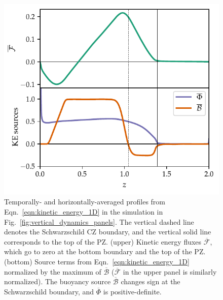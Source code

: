 \documentclass[twocolumn]{aastex631}
\renewcommand{\bar}[1]{\overline{#1}}
\begin{document}
\begin{figure}[t!]
\centering
\includegraphics[width=\columnwidth]{theory_profiles.pdf}
\caption{
Temporally- and horizontally-averaged profiles from Eqn.~\ref{eqn:kinetic_energy_1D} in the simulation in Fig.~\ref{fig:vertical_dynamics_panels}.
The vertical dashed line denotes the Schwarzschild CZ boundary, and the vertical solid line corresponds to the top of the PZ.
(upper) Kinetic energy fluxes $\bar{\mathcal{F}}$, which go to zero at the bottom boundary and the top of the PZ.
(bottom) Source terms from Eqn.~\ref{eqn:kinetic_energy_1D} normalized by the maximum of $\overline{\mathcal{B}}$ ($\bar{\mathcal{F}}$ in the upper panel is similarly normalized).
The buoyancy source $\bar{\mathcal{B}}$ changes sign at the Schwarzschild boundary, and $\bar{\Phi}$ is positive-definite.
\label{fig:theory_profiles}
}
\end{figure}
\end{document}
